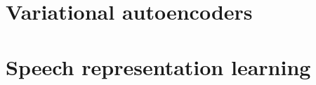 





\section{Variational autoencoders}





\section{Speech representation learning}



\iffalse



